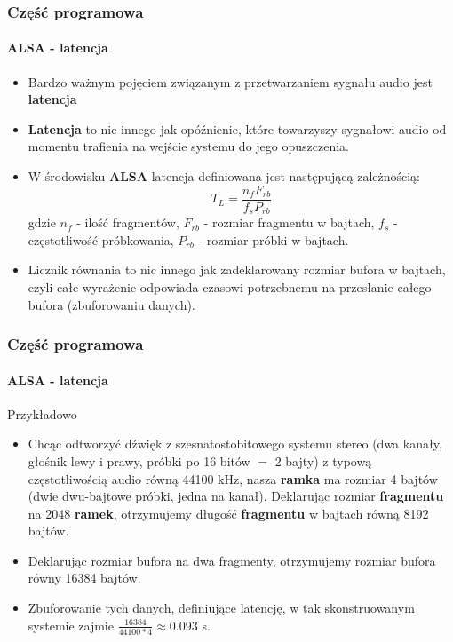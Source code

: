 \documentclass{beamer}
\begin{document}
\begin{frame}
\frametitle{Część programowa}
\framesubtitle{ALSA - latencja}
\begin{itemize}
\item Bardzo ważnym pojęciem związanym z przetwarzaniem sygnału audio jest \textbf{latencja}
\item \textbf{Latencja} to nic innego jak opóźnienie, które towarzyszy sygnałowi audio od momentu trafienia na wejście systemu do jego opuszczenia.
\item W środowisku \textbf{ALSA} latencja definiowana jest następującą zależnością:
\begin{equation}
	T_L = \frac{n_fF_{rb}}{f_sP_{rb}}
\end{equation}
gdzie $n_f$ - ilość fragmentów, $F_{rb}$ - rozmiar fragmentu w bajtach, $f_s$ - częstotliwość próbkowania, $P_{rb}$ - rozmiar próbki w bajtach. 
\item Licznik równania to nic innego jak zadeklarowany rozmiar bufora w bajtach, czyli całe wyrażenie odpowiada czasowi potrzebnemu na przesłanie całego bufora (zbuforowaniu danych).
\end{itemize}
\end{frame}

\begin{frame}
\frametitle{Część programowa}
\framesubtitle{ALSA - latencja}
Przykładowo
\begin{itemize}
\item Chcąc odtworzyć dźwięk z szesnatostobitowego systemu stereo (dwa kanały, głośnik lewy i prawy, próbki po 16 bitów $=$ 2 bajty) z typową częstotliwością audio równą 44100 kHz, nasza \textbf{ramka} ma rozmiar 4 bajtów (dwie dwu-bajtowe próbki, jedna na kanał). Deklarując rozmiar \textbf{fragmentu} na 2048 \textbf{ramek}, otrzymujemy długość \textbf{fragmentu} w bajtach równą 8192 bajtów.
\item Deklarując rozmiar bufora na dwa fragmenty, otrzymujemy rozmiar bufora równy 16384 bajtów.
\item Zbuforowanie tych danych, definiujące latencję, w tak skonstruowanym systemie zajmie $\frac{16384}{44100 * 4} \approx 0.093$ s.
\end{itemize}
\end{frame}
\end{document}
